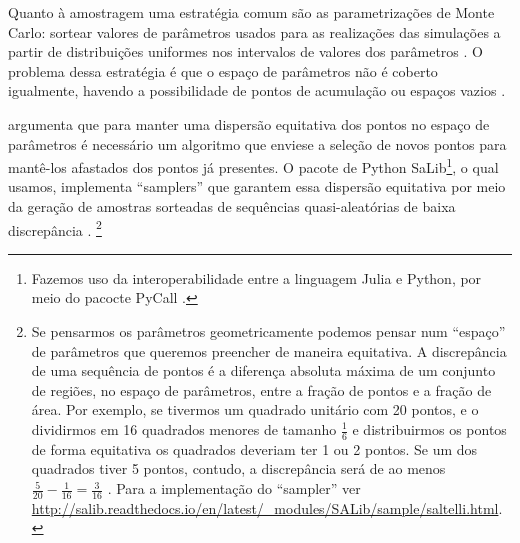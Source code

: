 Quanto à amostragem uma estratégia comum são as parametrizações de Monte Carlo:
sortear valores de parâmetros usados para as realizações das simulações a partir
de distribuições uniformes nos intervalos de valores dos parâmetros
\cite{laver2011party}. O problema dessa estratégia é que o espaço de parâmetros
não é coberto igualmente, havendo a possibilidade de pontos de acumulação ou
espaços vazios \cite{pereda2017brief}.

 argumenta que para manter uma dispersão
equitativa dos pontos no espaço de parâmetros é necessário um algoritmo que
enviese a seleção de novos pontos para mantê-los afastados dos pontos já
presentes. O pacote de Python SaLib\footnote{Fazemos uso da interoperabilidade
  entre a linguagem Julia e Python, por meio do pacocte PyCall
  \cite{johnson2018}.}, o qual usamos, implementa ``samplers'' que garantem essa
dispersão equitativa por meio da geração de amostras sorteadas de sequências
quasi-aleatórias de baixa discrepância \cite{herman2017salib}. \footnote{ Se
  pensarmos os parâmetros geometricamente podemos pensar num ``espaço'' de
  parâmetros que queremos preencher de maneira equitativa. A discrepância de uma
  sequência de pontos é a diferença absoluta máxima de um conjunto de regiões,
  no espaço de parâmetros, entre a fração de pontos e a fração de área. Por
  exemplo, se tivermos um quadrado unitário com 20 pontos, e o dividirmos em 16
  quadrados menores de tamanho \(\frac{1}{6}\) e distribuirmos os pontos de
  forma equitativa os quadrados deveriam ter 1 ou 2 pontos. Se um dos quadrados
  tiver 5 pontos, contudo, a discrepância será de ao menos \(\frac{5}{20} -
  \frac{1}{16} = \frac{3}{16}\) \cite[p.83]{saltelli2008global}. Para a
  implementação do ``sampler'' ver
  \url{http://salib.readthedocs.io/en/latest/_modules/SALib/sample/saltelli.html}.}

